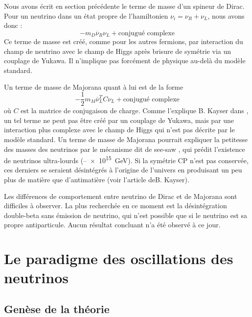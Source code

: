 	        Nous avons écrit en section précédente le terme de masse d'un spineur de Dirac. Pour un neutrino dans un état propre de l'hamiltonien $\nu_i=\nu_R+\nu_L$, nous avons donc : 
	        \begin{equation}
	        	-m_D\overline{\nu}_R \nu_L + \text{conjugué complexe}
	        \end{equation}
	        Ce terme de masse est créé, comme pour les autres fermions, par interaction du champ de neutrino avec le champ de Higgs après brisure de symétrie via un couplage de Yukawa. Il n'implique pas forcément de physique au-delà du modèle standard.
	        
	        Un terme de masse de Majorana quant à lui est de la forme
	        \begin{equation}\label{eq::majorana_mass}
	        -\frac{1}{2}m_M\overline{\nu}_L^T C \nu_L + \text{conjugué complexe}
	        \end{equation}
	        où $C$ est la matrice de conjugaison de charge. Comme l'explique B. Kayser dans \cite{Kayser2009}, un tel terme ne peut pas être créé par un couplage de Yukawa, mais par une interaction plus complexe avec le champ de Higgs qui n'est pas décrite par le modèle standard. Un terme de masse de Majorana pourrait expliquer la petitesse des masses des neutrinos par le mécanisme dit de see-saw , qui prédit l'existence de neutrinos ultra-lourds (--\SI{e15}{\giga\electronvolt}). Si la symétrie CP n'est pas conservée, ces derniers se seraient désintégrés à l'origine de l'univers en produisant un peu plus de matière que d'antimatière (voir l'article deB. Kayser\cite{Kayser2005}).
	        
	        Les différences de comportement entre neutrino de Dirac et de Majorana sont difficiles à observer. La plus recherchée en ce moment est la désintégration double-beta sans émission de neutrino, qui n'est possible que si le neutrino est sa propre antiparticule. Aucun résultat concluant n'a été observé à ce jour\cite{Dolinski2019}.
    
    \section{Le paradigme des oscillations des neutrinos}
    
        \subsection{Genèse de la théorie}
    
